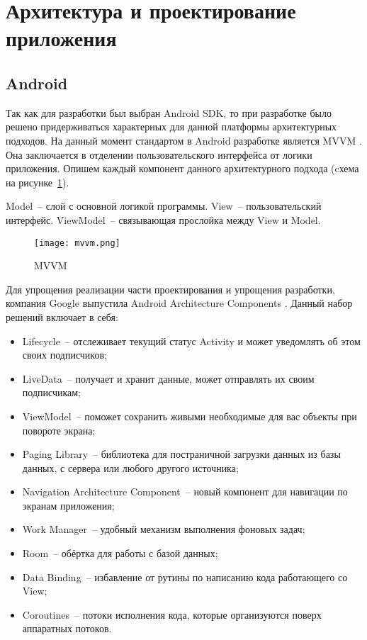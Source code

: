 \section{Архитектура и проектирование приложения}
\label{sec:arch_and_mod}
 
\subsection{Android}
Так как для разработки был выбран Android SDK, то при разработке было решено придерживаться характерных для данной платформы архитектурных подходов.
На данный момент стандартом в Android разработке является MVVM \cite{web7}.
Она заключается в отделении пользовательского интерфейса от логики приложения. Опишем каждый компонент данного архитектурного подхода (cхема на рисунке~\ref{fig:arch:docs_connections}).

Model~-- слой с основной логикой программы.
View~-- пользовательский интерфейс.
ViewModel~-- связывающая прослойка между View и Model.

\begin{figure}[H]
 \centering
   \texttt{[image: mvvm.png]} 
   \caption{MVVM}
   \label{fig:arch:docs_connections}
\end{figure}

Для упрощения реализации части проектирования и упрощения разработки, компания Google выпустила Android Architecture Components \cite{web8}. Данный набор решений включает в себя:

\begin{itemize}
 \item Lifecycle~-- отслеживает текущий статус Activity и может уведомлять об этом своих подписчиков;
 \item LiveData~-- получает и хранит данные, может отправлять их своим подписчикам;
 \item ViewModel~-- поможет сохранить живыми необходимые для вас объекты при повороте экрана;
 \item Paging Library~-- библиотека для постраничной загрузки данных из базы данных, с сервера или любого другого источника;
 \item Navigation Architecture Component~-- новый компонент для навигации по экранам приложения;
 \item Work Manager~-- удобный механизм выполнения фоновых задач;
 \item Room~-- обёртка для работы с базой данных;
 \item Data Binding~-- избавление от рутины по написанию кода работающего со View;
 \item Coroutines~-- потоки исполнения кода, которые организуются поверх аппаратных потоков.
 \end{itemize}

